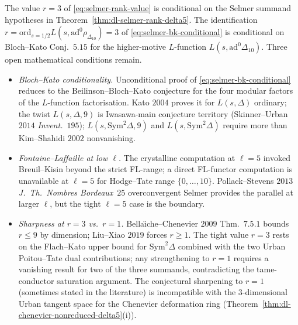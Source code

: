 \begin{remark}
\label{rem:dl-selmer-proof-obligations}
The value $r = 3$ of \eqref{eq:selmer-rank-value} is conditional on
the Selmer summand hypotheses in
Theorem~\ref{thm:dl-selmer-rank-delta5}. The identification
$r = \mathrm{ord}_{s = 1/2}L(s,\mathrm{ad}^0\rho_{\Delta_{10}}) = 3$ of
\eqref{eq:selmer-bk-conditional} is conditional on Bloch--Kato
Conj.~$5.15$ for the higher-motive $L$-function
$L(s,\mathrm{ad}^0\Delta_{10})$. Three open mathematical conditions remain.
\begin{itemize}
\item \emph{Bloch--Kato conditionality.} Unconditional proof of
 \eqref{eq:selmer-bk-conditional} reduces to the
 Beilinson--Bloch--Kato conjecture for the four modular factors of the
 $L$-function factorisation. Kato $2004$ proves it for
 $L(s,\Delta)$ ordinary; the twist $L(s,\Delta,9)$ is Iwasawa-main
 conjecture territory (Skinner--Urban $2014$
 \emph{Invent.}~$195$); $L(s,\mathrm{Sym}^2\Delta,9)$ and
 $L(s,\mathrm{Sym}^2\Delta)$ require more than Kim--Shahidi
 $2002$ nonvanishing.
\item \emph{Fontaine--Laffaille at low $\ell$.} The crystalline
 computation at $\ell = 5$ invoked Breuil--Kisin
 beyond the strict FL-range; a direct FL-functor computation is
 unavailable at $\ell = 5$ for Hodge--Tate range $\{0,\dots,10\}$.
 Pollack--Stevens $2013$ \emph{J.~Th.\ Nombres Bordeaux}~$25$
 overconvergent Selmer provides the parallel at larger $\ell$, but
 the tight $\ell = 5$ case is the boundary.
\item \emph{Sharpness at $r = 3$ vs.\ $r = 1$.} Bella\"\i che--Chenevier
 $2009$ Thm.~$7.5.1$ bounds $r\le 9$ by dimension; Liu--Xiao $2019$
 forces $r\ge 1$. The tight value $r = 3$ rests on the Flach--Kato
 upper bound for $\mathrm{Sym}^2\Delta$ combined with the two Urban
 Poitou--Tate dual contributions; any strengthening to
 $r = 1$ requires a vanishing result for two of the three
 summands, contradicting the tame-conductor saturation argument. The
 conjectural sharpening to $r = 1$ (sometimes stated in the literature)
 is incompatible with the $3$-dimensional Urban tangent space for
 the Chenevier deformation ring (Theorem~\ref{thm:dl-chenevier-nonreduced-delta5}(i)).
\end{itemize}
\end{remark}


